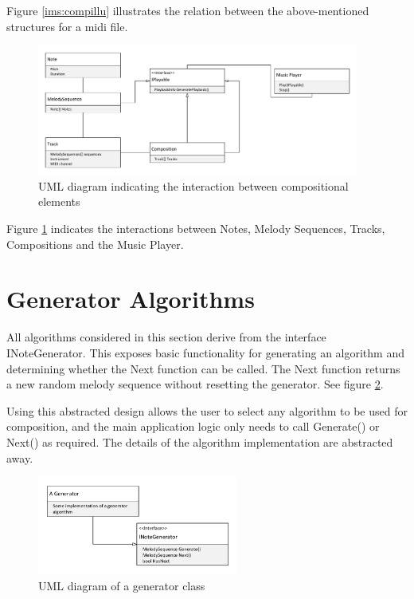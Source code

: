 Figure \ref{ims:compillu} illustrates the relation between the above-mentioned structures for a midi file.

\begin{figure}
\centerline{\includegraphics[width=400px]{../images/uml_notes.pdf}}
\caption{UML diagram indicating the interaction between compositional elements}
\label{ims:uml_notes}
\end{figure}

Figure \ref{ims:uml_notes} indicates the interactions between Notes, Melody Sequences, Tracks, Compositions and the Music Player.

\section{Generator Algorithms}
All algorithms considered in this section derive from the interface INoteGenerator. This exposes basic functionality for generating an algorithm and determining whether the Next function can be called. The Next function returns a new random melody sequence without resetting the generator. See figure \ref{ims:uml_generator}.

Using this abstracted design allows the user to select any algorithm to be used for composition, and the main application logic only needs to call Generate() or Next() as required. The details of the algorithm implementation are abstracted away.

\begin{figure}
\centerline{\includegraphics[width=250px]{../images/uml_generator.pdf}}
\caption{UML diagram of a generator class}
\label{ims:uml_generator}
\end{figure}

